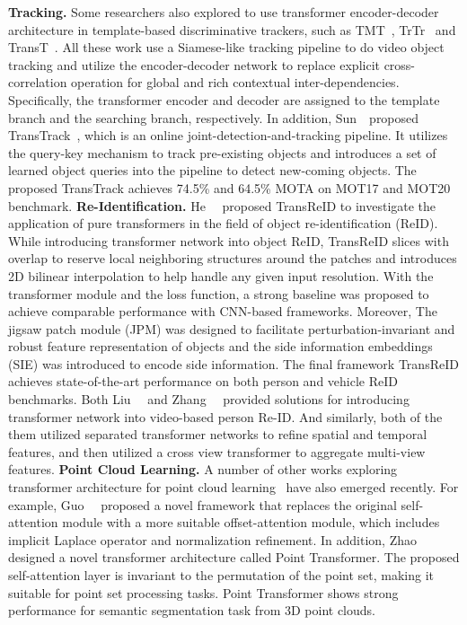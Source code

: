 \noindent\textbf{Tracking.}
Some researchers also explored to use transformer encoder-decoder architecture in template-based discriminative trackers, such as TMT~, TrTr~ and TransT~. 
All these work use a Siamese-like tracking pipeline to do video object tracking and utilize the encoder-decoder network to replace explicit cross-correlation operation for global and rich contextual inter-dependencies.
Specifically, the transformer encoder and decoder are assigned to the template branch and the searching branch, respectively. 
In addition, Sun~\etal~proposed TransTrack~, which is an online joint-detection-and-tracking pipeline. It utilizes the query-key mechanism to track pre-existing objects and introduces a set of learned object queries into the pipeline to detect new-coming objects.
The proposed TransTrack achieves 74.5\% and 64.5\% MOTA on MOT17 and MOT20 benchmark.
\noindent\textbf{Re-Identification.}
He~\etal~ proposed TransReID to investigate the application of pure transformers in the field of object re-identification (ReID).
While introducing transformer network into object ReID, TransReID slices with overlap to reserve local neighboring structures around the patches and introduces 2D bilinear interpolation to help handle any given input resolution.
With the transformer module and the loss function,  a strong baseline was proposed to achieve comparable performance with CNN-based frameworks.
Moreover, The jigsaw patch module (JPM) was designed to facilitate perturbation-invariant and robust feature representation of objects and the side information embeddings (SIE) was introduced  to encode side information.
The final framework TransReID achieves state-of-the-art performance on both person and vehicle ReID benchmarks.
Both Liu~\etal~ and Zhang~\etal~ provided solutions for introducing transformer network into video-based person Re-ID.
And similarly, both of the them utilized separated transformer networks to refine spatial and temporal features, and then utilized a cross view transformer to aggregate multi-view features.
\noindent\textbf{Point Cloud Learning.}
A number of other works exploring transformer architecture for point cloud learning~ have also emerged recently. For example, Guo~\etal~ proposed a novel framework that replaces the original self-attention module with a more suitable offset-attention module, which includes implicit Laplace operator and normalization refinement. In addition, Zhao~\etal~ designed a novel transformer architecture called Point Transformer. The proposed self-attention layer is invariant to the permutation of the point set, making it suitable for point set processing tasks. Point Transformer shows strong performance for semantic segmentation task from 3D point clouds.

